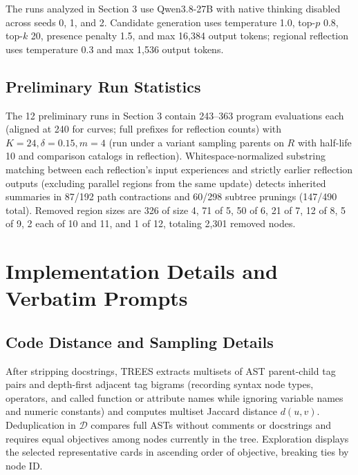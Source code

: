 \documentclass{article}
\begin{document}
The runs analyzed in Section 3 use Qwen3.8-27B with native thinking disabled across seeds 0, 1, and 2. Candidate generation uses temperature 1.0, top-\(p\) 0.8, top-\(k\) 20, presence penalty 1.5, and max 16,384 output tokens; regional reflection uses temperature 0.3 and max 1,536 output tokens.

\subsection{Preliminary Run Statistics}\label{preliminary-run-statistics}

The 12 preliminary runs in Section 3 contain 243--363 program evaluations each (aligned at 240 for curves; full prefixes for reflection counts) with \(K=24,\delta=0.15,m=4\) (run under a variant sampling parents on \(R\) with half-life 10 and comparison catalogs in reflection). Whitespace-normalized substring matching between each reflection's input experiences and strictly earlier reflection outputs (excluding parallel regions from the same update) detects inherited summaries in 87/192 path contractions and 60/298 subtree prunings (147/490 total). Removed region sizes are 326 of size 4, 71 of 5, 50 of 6, 21 of 7, 12 of 8, 5 of 9, 2 each of 10 and 11, and 1 of 12, totaling 2,301 removed nodes.

\section{Implementation Details and Verbatim Prompts}\label{implementation-details-and-verbatim-prompts}

\subsection{Code Distance and Sampling Details}\label{code-distance-and-sampling-details}

After stripping docstrings, TREES extracts multisets of AST parent-child tag pairs and depth-first adjacent tag bigrams (recording syntax node types, operators, and called function or attribute names while ignoring variable names and numeric constants) and computes multiset Jaccard distance \(d(u,v)\). Deduplication in \(\mathcal D\) compares full ASTs without comments or docstrings and requires equal objectives among nodes currently in the tree. Exploration displays the selected representative cards in ascending order of objective, breaking ties by node ID.
\end{document}
